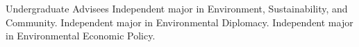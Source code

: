 %
%
\begin{rubric}{Undergraduate Advisees}
Independent major in Environment, Sustainability, and Community.
Independent major in Environmental Diplomacy.
Independent major in Environmental Economic Policy.
\end{rubric}
